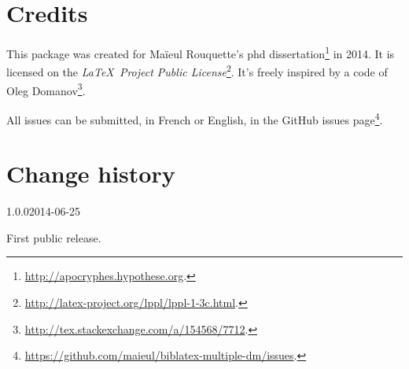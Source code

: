 \documentclass{ltxdockit}[2011/03/25]
\begin{document}
\section{Credits}

This package was created for Maïeul Rouquette's phd dissertation\footnote{\url{http://apocryphes.hypothese.org}.} in 2014. It is licensed on the \emph{\LaTeX\ Project Public License}\footnote{\url{http://latex-project.org/lppl/lppl-1-3c.html}.}. It's freely inspired by a code of Oleg Domanov\footnote{\url{http://tex.stackexchange.com/a/154568/7712}.}.


All issues can be submitted, in French or English, in the GitHub issues page\footnote{\url{https://github.com/maieul/biblatex-multiple-dm/issues}.}.

\section{Change history}

\begin{changelog}



\begin{release}{1.0.0}{2014-06-25}
\item First public release.
\end{release}
\end{changelog}
\end{document}
